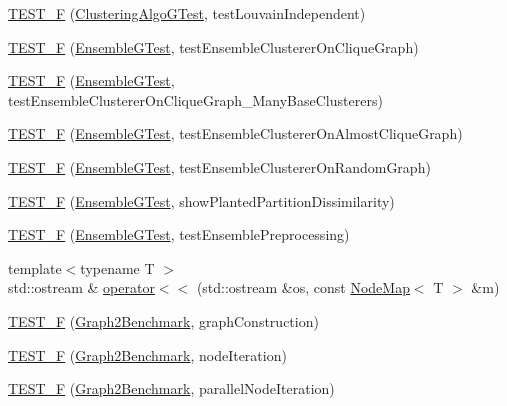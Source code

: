 \begin{DoxyCompactItemize}
\item 
\hyperlink{namespace_networ_kit_a26469c703678f995168ed5c56d7f5162}{T\-E\-S\-T\-\_\-\-F} (\hyperlink{class_networ_kit_1_1_clustering_algo_g_test}{Clustering\-Algo\-G\-Test}, test\-Louvain\-Independent)
\item 
\hyperlink{namespace_networ_kit_a564f49207cf5c5bc26f822ab61e487a1}{T\-E\-S\-T\-\_\-\-F} (\hyperlink{class_networ_kit_1_1_ensemble_g_test}{Ensemble\-G\-Test}, test\-Ensemble\-Clusterer\-On\-Clique\-Graph)
\item 
\hyperlink{namespace_networ_kit_a1ec91cf47d849707d2972eabe5a98e5b}{T\-E\-S\-T\-\_\-\-F} (\hyperlink{class_networ_kit_1_1_ensemble_g_test}{Ensemble\-G\-Test}, test\-Ensemble\-Clusterer\-On\-Clique\-Graph\-\_\-\-Many\-Base\-Clusterers)
\item 
\hyperlink{namespace_networ_kit_afb6750a92496be71250132e4bd1a1fbf}{T\-E\-S\-T\-\_\-\-F} (\hyperlink{class_networ_kit_1_1_ensemble_g_test}{Ensemble\-G\-Test}, test\-Ensemble\-Clusterer\-On\-Almost\-Clique\-Graph)
\item 
\hyperlink{namespace_networ_kit_a81aaba6126ba577a8cfc6d270d04736a}{T\-E\-S\-T\-\_\-\-F} (\hyperlink{class_networ_kit_1_1_ensemble_g_test}{Ensemble\-G\-Test}, test\-Ensemble\-Clusterer\-On\-Random\-Graph)
\item 
\hyperlink{namespace_networ_kit_abeaf134ff5af9938fda99c89d063145f}{T\-E\-S\-T\-\_\-\-F} (\hyperlink{class_networ_kit_1_1_ensemble_g_test}{Ensemble\-G\-Test}, show\-Planted\-Partition\-Dissimilarity)
\item 
\hyperlink{namespace_networ_kit_a2883f72f8f6b4c920264ab7bd31f8ac3}{T\-E\-S\-T\-\_\-\-F} (\hyperlink{class_networ_kit_1_1_ensemble_g_test}{Ensemble\-G\-Test}, test\-Ensemble\-Preprocessing)
\item 
{\footnotesize template$<$typename T $>$ }\\std\-::ostream \& \hyperlink{namespace_networ_kit_a8c89ddcd9b3d7bdce027da061f7ad522}{operator$<$$<$} (std\-::ostream \&os, const \hyperlink{class_networ_kit_1_1_node_map}{Node\-Map}$<$ T $>$ \&m)
\item 
\hyperlink{namespace_networ_kit_a1380d5e4eef1fb7e4e4eb7456506b457}{T\-E\-S\-T\-\_\-\-F} (\hyperlink{class_networ_kit_1_1_graph2_benchmark}{Graph2\-Benchmark}, graph\-Construction)
\item 
\hyperlink{namespace_networ_kit_a0f6fd2148f725f49525424061e0d57d8}{T\-E\-S\-T\-\_\-\-F} (\hyperlink{class_networ_kit_1_1_graph2_benchmark}{Graph2\-Benchmark}, node\-Iteration)
\item 
\hyperlink{namespace_networ_kit_a021d1e9c1f29871187483f76919e1898}{T\-E\-S\-T\-\_\-\-F} (\hyperlink{class_networ_kit_1_1_graph2_benchmark}{Graph2\-Benchmark}, parallel\-Node\-Iteration)

\end{DoxyCompactItemize}
